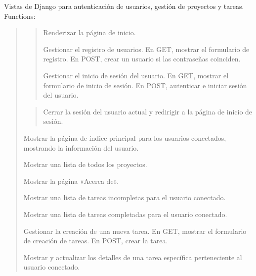 \documentclass[letterpaper,10pt,spanish]{sphinxmanual}
\begin{document}
\label{\detokenize{myapp:module-myapp.views}}
\sphinxAtStartPar
Vistas de Django para autenticación de usuarios, gestión de proyectos y tareas.
Functions:
\begin{quote}
\begin{quote}
\begin{description}
\sphinxAtStartPar
Renderizar la página de inicio.

\sphinxAtStartPar
Gestionar el registro de usuarios. En GET, mostrar el formulario de registro. En POST, crear un usuario si las contraseñas coinciden.

\sphinxAtStartPar
Gestionar el inicio de sesión del usuario. En GET, mostrar el formulario de inicio de sesión. En POST, autenticar e iniciar sesión del usuario.

\end{description}
\end{quote}
\begin{description}
\begin{quote}

\sphinxAtStartPar
Cerrar la sesión del usuario actual y redirigir a la página de inicio de sesión.
\end{quote}
\begin{description}
\sphinxAtStartPar
Mostrar la página de índice principal para los usuarios conectados, mostrando la información del usuario.

\sphinxAtStartPar
Mostrar una lista de todos los proyectos.

\sphinxAtStartPar
Mostrar la página «Acerca de».

\sphinxAtStartPar
Mostrar una lista de tareas incompletas para el usuario conectado.

\sphinxAtStartPar
Mostrar una lista de tareas completadas para el usuario conectado.

\sphinxAtStartPar
Gestionar la creación de una nueva tarea. En GET, mostrar el formulario de creación de tareas. En POST, crear la tarea.

\sphinxAtStartPar
Mostrar y actualizar los detalles de una tarea específica perteneciente al usuario conectado.


\end{description}
\end{description}
\end{quote}
\end{document}
